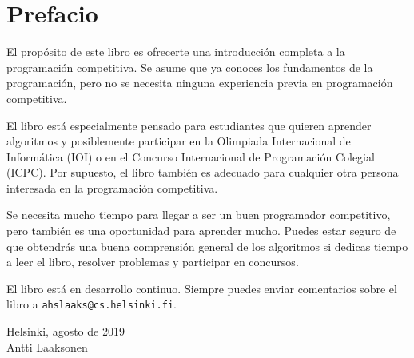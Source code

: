 \chapter*{Prefacio}

El propósito de este libro es ofrecerte
una introducción completa a la programación competitiva.
Se asume que ya
conoces los fundamentos de la programación, pero no se necesita
ninguna experiencia previa en programación competitiva.

El libro está especialmente pensado para
estudiantes que quieren aprender algoritmos y
posiblemente participar en
la Olimpiada Internacional de Informática (IOI) o
en el Concurso Internacional de Programación Colegial (ICPC).
Por supuesto, el libro también es adecuado para
cualquier otra persona interesada en la programación competitiva.

Se necesita mucho tiempo para llegar a ser un buen programador
competitivo, pero también es una oportunidad para aprender mucho.
Puedes estar seguro de que obtendrás
una buena comprensión general de los algoritmos
si dedicas tiempo a leer el libro,
resolver problemas y participar en concursos.

El libro está en desarrollo continuo.
Siempre puedes enviar comentarios sobre el libro a
\texttt{ahslaaks@cs.helsinki.fi}.

\begin{flushright}
Helsinki, agosto de 2019 \\
Antti Laaksonen
\end{flushright}
